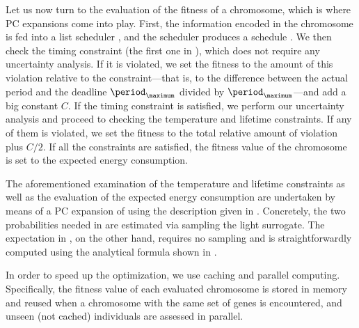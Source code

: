 Let us now turn to the evaluation of the fitness of a chromosome, which is where
\ac{PC} expansions come into play. First, the information encoded in the
chromosome is fed into a list scheduler \cite{adam1974}, and the scheduler
produces a schedule \schedule. We then check the timing constraint (the first
one in ), which does not require any
uncertainty analysis. If it is violated, we set the fitness to the amount of
this violation relative to the constraint---that is, to the difference between
the actual period and the deadline $\period_\maximum$ divided by
$\period_\maximum$---and add a big constant $C$. If the timing constraint is
satisfied, we perform our uncertainty analysis and proceed to checking the
temperature and lifetime constraints. If any of them is violated, we set the
fitness to the total relative amount of violation plus $C / 2$. If all the
constraints are satisfied, the fitness value of the chromosome is set to the
expected energy consumption.

The aforementioned examination of the temperature and lifetime constraints as
well as the evaluation of the expected energy consumption are undertaken by
means of a \ac{PC} expansion of  using the
description given in . Concretely, the two probabilities
needed in  are estimated via sampling the
light surrogate. The expectation in , on the
other hand, requires no sampling and is straightforwardly computed using the
analytical formula shown in .

\begin{remark}
In order to speed up the optimization, we use caching and parallel computing.
Specifically, the fitness value of each evaluated chromosome is stored in memory
and reused when a chromosome with the same set of genes is encountered, and
unseen (not cached) individuals are assessed in parallel.
\end{remark}
